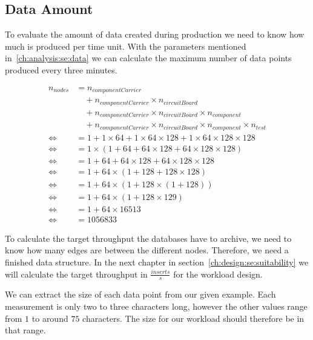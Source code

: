 \subsection{Data Amount}
\label{ch:analysis:se:dataAmount}
To evaluate the amount of data created during production we need to know how much is produced per time unit.
With the parameters mentioned in~\ref{ch:analysis:se:data} we can calculate the maximum number of data points produced every three minutes.

\begin{equation}
  \label{eq:dataAmount}
  \begin{aligned}
    n_{nodes} &= n_{componentCarrier} \\
    &\quad + n_{componentCarrier} \times n_{circuitBoard} \\
    &\quad + n_{componentCarrier} \times n_{circuitBoard} \times n_{component} \\
    &\quad + n_{componentCarrier} \times n_{circuitBoard} \times n_{component} \times n_{test} \\
    \iff &= 1 + 1 \times 64 + 1 \times 64 \times 128 + 1 \times 64 \times 128 \times 128 \\
    \iff &= 1 \times (1 + 64 + 64 \times 128 + 64 \times 128 \times 128) \\
    \iff &= 1 + 64 + 64 \times 128 + 64 \times 128 \times 128 \\
    \iff &= 1 + 64 \times (1 + 128 + 128 \times 128) \\
    \iff &= 1 + 64 \times (1 + 128 \times (1 + 128)) \\
    \iff &= 1 + 64 \times (1 + 128 \times 129) \\
    \iff &= 1 + 64 \times 16513 \\
    \iff &= 1056833
  \end{aligned}
\end{equation}

To calculate the target throughput the databases have to archive,
we need to know how many edges are between the different nodes.
Therefore,
we need a finished data structure.
In the next chapter in section~\ref{ch:design:se:suitability} we will calculate the target throughput in $ \frac{inserts}{s} $ for the workload design.

We can extract the size of each data point from our given example.
Each measurement is only two to three characters long,
however the other values range from $ 1 $ to around $ 75 $ characters.
The size for our workload should therefore be in that range.

